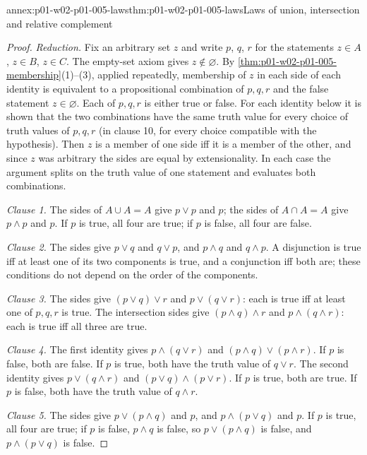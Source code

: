 \begin{annexitem}{annex:p01-w02-p01-005-laws}{thm:p01-w02-p01-005-laws}{Laws of union, intersection and relative complement}
\begin{proof}
\emph{Reduction.} Fix an arbitrary set \(z\) and write
\(p\), \(q\), \(r\) for the statements \(z\in A\), \(z\in B\), \(z\in C\).
The empty-set axiom gives \(z\notin\varnothing\). By
\cref{thm:p01-w02-p01-005-membership}(1)--(3), applied repeatedly, membership
of \(z\) in each side of each identity is equivalent to a propositional
combination of \(p,q,r\) and the false statement \(z\in\varnothing\). Each of
\(p,q,r\) is either true or false. For each identity below it is shown that
the two combinations have the same truth value for every choice of truth
values of \(p,q,r\) (in clause 10, for every choice compatible with the
hypothesis). Then \(z\) is a member of one side iff it is a member of the
other, and since \(z\) was arbitrary the sides are equal by extensionality.
In each case the argument splits on the truth value of one statement and
evaluates both combinations.

\emph{Clause 1.} The sides of \(A\cup A=A\) give \(p\lor p\) and \(p\); the
sides of \(A\cap A=A\) give \(p\land p\) and \(p\). If \(p\) is true, all four
are true; if \(p\) is false, all four are false.

\emph{Clause 2.} The sides give \(p\lor q\) and \(q\lor p\), and \(p\land q\)
and \(q\land p\). A disjunction is true iff at least one of its two components
is true, and a conjunction iff both are; these conditions do not depend on the
order of the components.

\emph{Clause 3.} The sides give \((p\lor q)\lor r\) and \(p\lor(q\lor r)\):
each is true iff at least one of \(p,q,r\) is true. The intersection sides
give \((p\land q)\land r\) and \(p\land(q\land r)\): each is true iff all three
are true.

\emph{Clause 4.} The first identity gives \(p\land(q\lor r)\) and
\((p\land q)\lor(p\land r)\). If \(p\) is false, both are false. If \(p\) is
true, both have the truth value of \(q\lor r\). The second identity gives
\(p\lor(q\land r)\) and \((p\lor q)\land(p\lor r)\). If \(p\) is true, both are
true. If \(p\) is false, both have the truth value of \(q\land r\).

\emph{Clause 5.} The sides give \(p\lor(p\land q)\) and \(p\), and
\(p\land(p\lor q)\) and \(p\). If \(p\) is true, all four are true; if \(p\) is
false, \(p\land q\) is false, so \(p\lor(p\land q)\) is false, and
\(p\land(p\lor q)\) is false.


\end{proof}
\end{annexitem}
